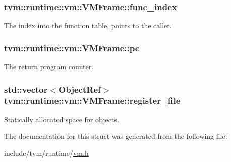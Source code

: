 \subsubsection[{\texorpdfstring{func\+\_\+index}{func_index}}]{ tvm\+::runtime\+::vm\+::\+V\+M\+Frame\+::func\+\_\+index}\hypertarget{structtvm_1_1runtime_1_1vm_1_1VMFrame_a96a641c01ca63e6b146ef321319ec1f4}{}\label{structtvm_1_1runtime_1_1vm_1_1VMFrame_a96a641c01ca63e6b146ef321319ec1f4}


The index into the function table, points to the caller. 

\subsubsection[{\texorpdfstring{pc}{pc}}]{ tvm\+::runtime\+::vm\+::\+V\+M\+Frame\+::pc}\hypertarget{structtvm_1_1runtime_1_1vm_1_1VMFrame_af798dec5a7e9049d6673093d2f3e7dea}{}\label{structtvm_1_1runtime_1_1vm_1_1VMFrame_af798dec5a7e9049d6673093d2f3e7dea}


The return program counter. 

\subsubsection[{\texorpdfstring{register\+\_\+file}{register_file}}]{\setlength{\rightskip}{0pt plus 5cm}std\+::vector$<${\bf Object\+Ref}$>$ tvm\+::runtime\+::vm\+::\+V\+M\+Frame\+::register\+\_\+file}\hypertarget{structtvm_1_1runtime_1_1vm_1_1VMFrame_a583dcf6c0ed3f3d2916679382c7a0775}{}\label{structtvm_1_1runtime_1_1vm_1_1VMFrame_a583dcf6c0ed3f3d2916679382c7a0775}


Statically allocated space for objects. 



The documentation for this struct was generated from the following file\+:\begin{DoxyCompactItemize}
\item 
include/tvm/runtime/\hyperlink{vm_8h}{vm.\+h}\end{DoxyCompactItemize}
